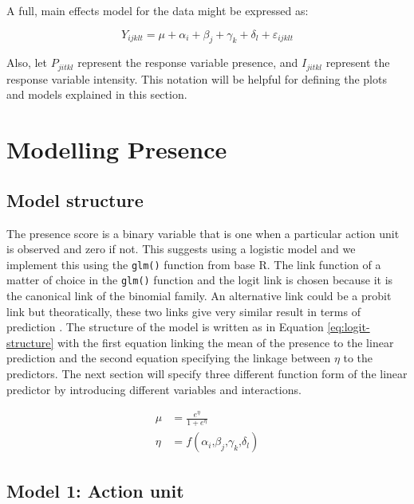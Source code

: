 \documentclass{monashthesis}
\begin{document}
A full, main effects model for the data might be expressed as:

\[Y_{ijklt} = \mu + \alpha_i + \beta_j + \gamma_k + \delta_l + \varepsilon_{ijklt}\]

\noindent Also, let \(P_{jitkl}\) represent the response variable presence, and \(I_{jitkl}\) represent the response variable intensity. This notation will be helpful for defining the plots and models explained in this section.

\hypertarget{modelling-presence}{%
\section{Modelling Presence}\label{modelling-presence}}

\hypertarget{model-structure}{%
\subsection{Model structure}\label{model-structure}}

The presence score is a binary variable that is one when a particular action unit is observed and zero if not. This suggests using a logistic model and we implement this using the \texttt{glm()} function from base R. The link function of a matter of choice in the \texttt{glm()} function and the logit link is chosen because it is the canonical link of the binomial family. An alternative link could be a probit link but theoratically, these two links give very similar result in terms of prediction \textcite{faraway2016extending}. The structure of the model is written as in Equation \ref{eq:logit-structure} with the first equation linking the mean of the presence to the linear prediction and the second equation specifying the linkage between \(\eta\) to the predictors. The next section will specify three different function form of the linear predictor by introducing different variables and interactions.

\begin{align}\label{eq:logit-structure}
\mu &= \frac{e^{\eta}}{1 + e^{\eta}} \\
\eta &= f(\alpha_i\text{,}\beta_j\text{,}\gamma_k\text{,}\delta_l)
\end{align}

\hypertarget{model-1-action-unit}{%
\subsection{Model 1: Action unit}\label{model-1-action-unit}}
\end{document}
